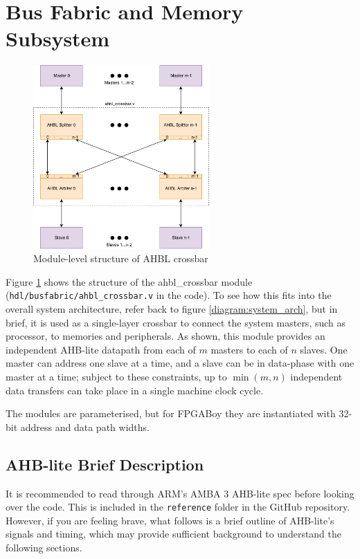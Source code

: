 \documentclass{article}
\begin{document}
\section{Bus Fabric and Memory Subsystem}

\begin{figure}[!htb]
\centering
\label{diagram:crossbar_structure}
\caption{Module-level structure of AHBL crossbar}
\includegraphics[width=0.6\textwidth]{diagrams/crossbar_structure.pdf}
\end{figure}

Figure \ref{diagram:crossbar_structure} shows the structure of the ahbl\_crossbar module (\texttt{hdl/busfabric/ahbl\_crossbar.v} in the code). To see how this fits into the overall system architecture, refer back to figure \ref{diagram:system_arch}, but in brief, it is used as a single-layer crossbar to connect the system masters, such as processor, to memories and peripherals. As shown, this module provides an independent AHB-lite datapath from each of $m$ masters to each of $n$ slaves. One master can address one slave at a time, and a slave can be in data-phase with one master at a time; subject to these constraints, up to $\min(m,n)$ independent data transfers can take place in a single machine clock cycle.

The modules are parameterised, but for FPGABoy they are instantiated with 32-bit address and data path widths.

\subsection{AHB-lite Brief Description}

It is recommended to read through ARM's AMBA 3 AHB-lite spec before looking over the code. This is included in the \texttt{reference} folder in the GitHub repository. However, if you are feeling brave, what follows is a brief outline of AHB-lite's signals and timing, which may provide sufficient background to understand the following sections.
\end{document}
